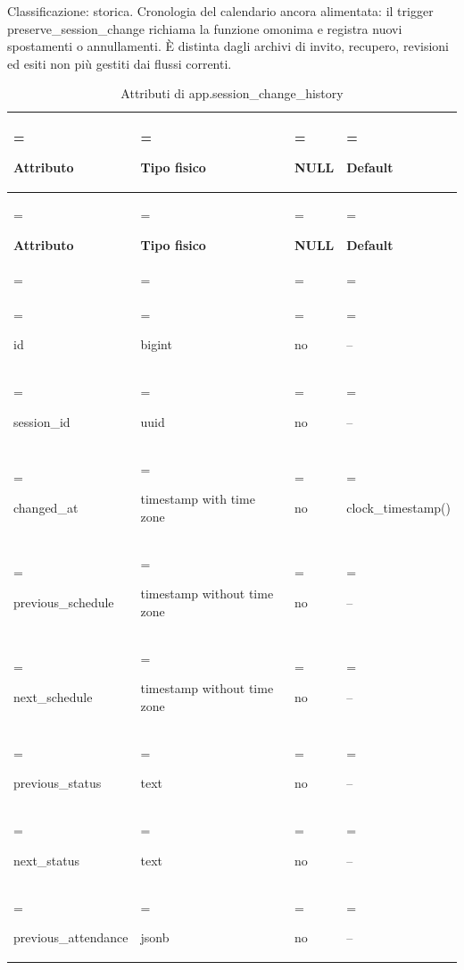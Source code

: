 \documentclass[11pt,a4paper]{article}
\begin{document}
Classificazione: storica. Cronologia del calendario ancora alimentata: il trigger preserve\_session\_change richiama la funzione omonima e registra nuovi spostamenti o annullamenti. È distinta dagli archivi di invito, recupero, revisioni ed esiti non più gestiti dai flussi correnti.

{\small \renewcommand{\arraystretch}{1.2}

\begin{xltabular}{\linewidth}{>{\hsize\linewidth=\hsize\raggedright\arraybackslash}X>{\hsize\linewidth=\hsize\raggedright\arraybackslash}X>{\hsize\linewidth=\hsize\raggedright\arraybackslash}X>{\hsize\linewidth=\hsize\raggedright\arraybackslash}X}
\caption{Attributi di app.session\_change\_history}\label{tab:dictionary-22}\\
\toprule

\textbf{Attributo} & \textbf{Tipo fisico} & \textbf{NULL} & \textbf{Default}\\\midrule\endfirsthead\toprule\textbf{Attributo} & \textbf{Tipo fisico} & \textbf{NULL} & \textbf{Default}\\\midrule\endhead
\midrule{}\\\endfoot\bottomrule\endlastfoot


{\ttfamily\small id} & {\ttfamily\small bigint} & no & {\ttfamily\small --}\\\addlinespace[3pt]

{\ttfamily\small session\_\allowbreak{}id} & {\ttfamily\small uuid} & no & {\ttfamily\small --}\\\addlinespace[3pt]

{\ttfamily\small changed\_\allowbreak{}at} & {\ttfamily\small timestamp with time zone} & no & {\ttfamily\small clock\_\allowbreak{}timestamp(\allowbreak{})}\\\addlinespace[3pt]

{\ttfamily\small previous\_\allowbreak{}schedule} & {\ttfamily\small timestamp without time zone} & no & {\ttfamily\small --}\\\addlinespace[3pt]

{\ttfamily\small next\_\allowbreak{}schedule} & {\ttfamily\small timestamp without time zone} & no & {\ttfamily\small --}\\\addlinespace[3pt]

{\ttfamily\small previous\_\allowbreak{}status} & {\ttfamily\small text} & no & {\ttfamily\small --}\\\addlinespace[3pt]

{\ttfamily\small next\_\allowbreak{}status} & {\ttfamily\small text} & no & {\ttfamily\small --}\\\addlinespace[3pt]

{\ttfamily\small previous\_\allowbreak{}attendance} & {\ttfamily\small jsonb} & no & {\ttfamily\small --}\\*

\end{xltabular}}
\end{document}
